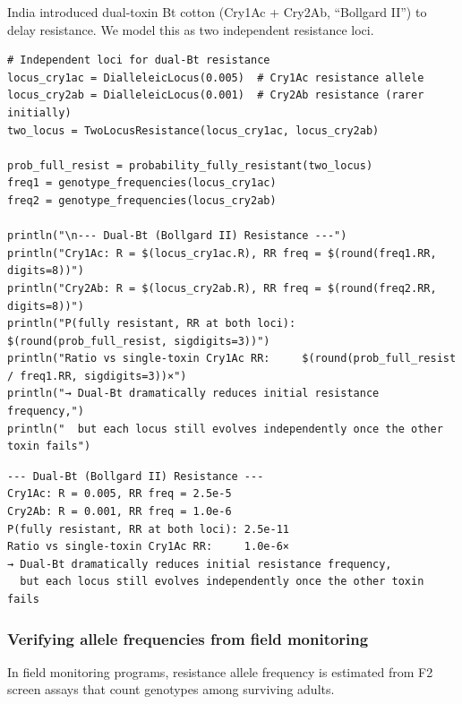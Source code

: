 \label{12675828485929543137}{}


India introduced dual-toxin Bt cotton (Cry1Ac + Cry2Ab, “Bollgard II”) to delay resistance. We model this as two independent resistance loci.




\begin{verbatim}
# Independent loci for dual-Bt resistance
locus_cry1ac = DialleleicLocus(0.005)  # Cry1Ac resistance allele
locus_cry2ab = DialleleicLocus(0.001)  # Cry2Ab resistance (rarer initially)
two_locus = TwoLocusResistance(locus_cry1ac, locus_cry2ab)

prob_full_resist = probability_fully_resistant(two_locus)
freq1 = genotype_frequencies(locus_cry1ac)
freq2 = genotype_frequencies(locus_cry2ab)

println("\n--- Dual-Bt (Bollgard II) Resistance ---")
println("Cry1Ac: R = $(locus_cry1ac.R), RR freq = $(round(freq1.RR, digits=8))")
println("Cry2Ab: R = $(locus_cry2ab.R), RR freq = $(round(freq2.RR, digits=8))")
println("P(fully resistant, RR at both loci): $(round(prob_full_resist, sigdigits=3))")
println("Ratio vs single-toxin Cry1Ac RR:     $(round(prob_full_resist / freq1.RR, sigdigits=3))×")
println("→ Dual-Bt dramatically reduces initial resistance frequency,")
println("  but each locus still evolves independently once the other toxin fails")
\end{verbatim}




\begin{verbatim}
--- Dual-Bt (Bollgard II) Resistance ---
Cry1Ac: R = 0.005, RR freq = 2.5e-5
Cry2Ab: R = 0.001, RR freq = 1.0e-6
P(fully resistant, RR at both loci): 2.5e-11
Ratio vs single-toxin Cry1Ac RR:     1.0e-6×
→ Dual-Bt dramatically reduces initial resistance frequency,
  but each locus still evolves independently once the other toxin fails
\end{verbatim}



\subsubsection{Verifying allele frequencies from field monitoring}



\label{9243001414960905053}{}


In field monitoring programs, resistance allele frequency is estimated from F2 screen assays that count genotypes among surviving adults.




